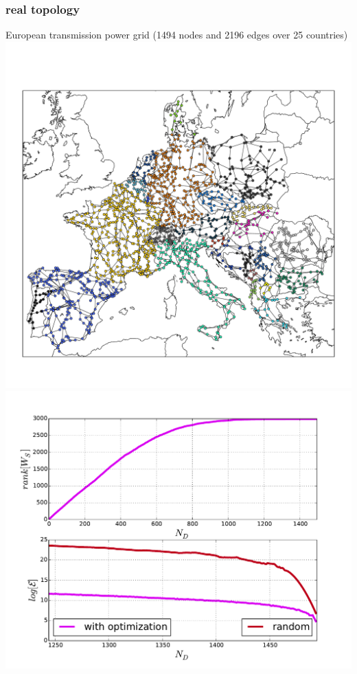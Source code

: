 \documentclass[xcolor=dvipsnames]{beamer}
\begin{document}
\begin{frame}
	\frametitle{real topology}
	
	{\footnotesize European transmission power grid (1494 nodes and 2196 edges over 25 countries) }
	\includegraphics[scale=.165]{power_grid}
	\includegraphics[scale=.26]{figs2}
\end{frame}
\end{document}
